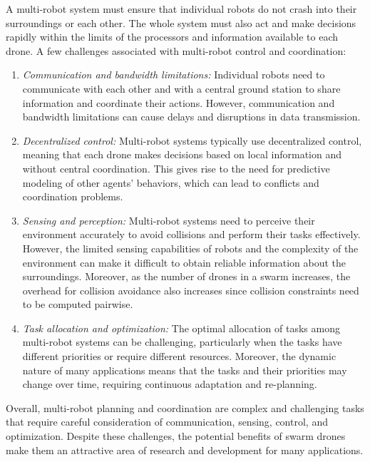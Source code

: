 A multi-robot system must ensure that individual robots do not crash into their surroundings or each other. The whole system must also act and make decisions rapidly within the limits of the processors and information available to each drone. A few challenges associated with multi-robot control and coordination:

\begin{enumerate}
    \item \textit{Communication and bandwidth limitations:} Individual robots need to communicate with each other and with a central ground station to share information and coordinate their actions. However, communication and bandwidth limitations can cause delays and disruptions in data transmission. 

    \item \textit{Decentralized control:} Multi-robot systems typically use decentralized control, meaning that each drone makes decisions based on local information and without central coordination. This gives rise to the need for predictive modeling of other agents' behaviors, which can lead to conflicts and coordination problems.

    \item \textit{Sensing and perception:} Multi-robot systems need to perceive their environment accurately to avoid collisions and perform their tasks effectively. However, the limited sensing capabilities of robots and the complexity of the environment can make it difficult to obtain reliable information about the surroundings. Moreover, as the number of drones in a swarm increases, the overhead for collision avoidance also increases since collision constraints need to be computed pairwise.

    \item \textit{Task allocation and optimization:} The optimal allocation of tasks among multi-robot systems can be challenging, particularly when the tasks have different priorities or require different resources. Moreover, the dynamic nature of many applications means that the tasks and their priorities may change over time, requiring continuous adaptation and re-planning.
    
\end{enumerate}

Overall, multi-robot planning and coordination are complex and challenging tasks that require careful consideration of communication, sensing, control, and optimization. Despite these challenges, the potential benefits of swarm drones make them an attractive area of research and development for many applications.

